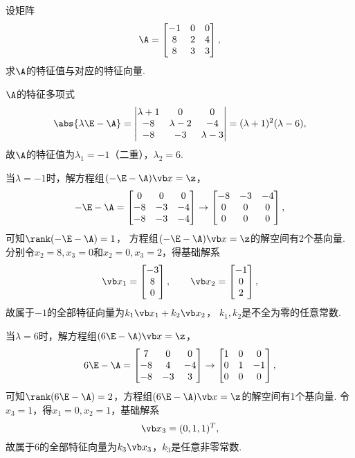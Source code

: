 \begin{example}
设矩阵\[
	\A = \begin{bmatrix}
		-1 & 0 & 0 \\
		8 & 2 & 4 \\
		8 & 3 & 3
	\end{bmatrix},
\]
求\(\A\)的特征值与对应的特征向量.
\begin{solution}
\(\A\)的特征多项式\[
	\abs{\lambda\E-\A}
	= \begin{vmatrix}
		\lambda+1 & 0 & 0 \\
		-8 & \lambda-2 & -4 \\
		-8 & -3 & \lambda-3
	\end{vmatrix}
	= (\lambda+1)^2 (\lambda-6),
\]
故\(\A\)的特征值为\(\lambda_1=-1\)（二重），\(\lambda_2=6\).

当\(\lambda=-1\)时，解方程组\((-\E-\A)\x = \z\)，\[
	-\E-\A = \begin{bmatrix}
		0 & 0 & 0 \\
		-8 & -3 & -4 \\
		-8 & -3 & -4
	\end{bmatrix} \to \begin{bmatrix}
		-8 & -3 & -4 \\
		0 & 0 & 0 \\
		0 & 0 & 0
	\end{bmatrix},
\]
可知\(\rank(-\E-\A) = 1\)，
方程组\((-\E-\A)\x = \z\)的解空间有2个基向量.
分别令\(x_2 = 8, x_3 = 0\)和\(x_2 = 0, x_3 = 2\)，得基础解系\[
	\x_1 = \begin{bmatrix} -3 \\ 8 \\ 0 \end{bmatrix},
	\qquad
	\x_2 = \begin{bmatrix} -1 \\ 0 \\ 2 \end{bmatrix},
\]
故属于\(-1\)的全部特征向量为\(k_1 \x_1 + k_2 \x_2\)，
\(k_1,k_2\)是不全为零的任意常数.

当\(\lambda=6\)时，解方程组\((6\E-\A)\x = \z\)，\[
	6\E-\A = \begin{bmatrix}
		7 & 0 & 0 \\
		-8 & 4 & -4 \\
		-8 & -3 & 3
	\end{bmatrix} \to \begin{bmatrix}
		1 & 0 & 0 \\
		0 & 1 & -1 \\
		0 & 0 & 0
	\end{bmatrix},
\]
可知\(\rank(6\E-\A) = 2\)，方程组\((6\E-\A)\x = \z\)的解空间有1个基向量.
令\(x_3 = 1\)，得\(x_1 = 0, x_2 = 1\)，基础解系\[
	\x_3 = (0,1,1)^T,
\]
故属于\(6\)的全部特征向量为\(k_3 \x_3\)，\(k_3\)是任意非零常数.
\end{solution}
\end{example}

